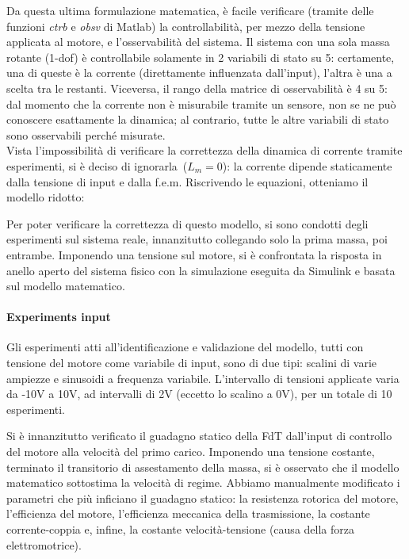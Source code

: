 Da questa ultima formulazione matematica, è facile verificare (tramite delle funzioni \textit{ctrb} e \textit{obsv} di Matlab) la controllabilità, per mezzo della tensione applicata al motore, e l'osservabilità del sistema.
Il sistema con una sola massa rotante (1-dof) è controllabile solamente in 2 variabili di stato su 5: certamente, una di queste è la corrente (direttamente influenzata dall'input), l'altra è una a scelta tra le restanti. Viceversa, il rango della matrice di osservabilità è 4 su 5: dal momento che la corrente non è misurabile tramite un sensore, non se ne può conoscere esattamente la dinamica; al contrario, tutte le altre variabili di stato sono osservabili perché misurate. \\

Vista l'impossibilità di verificare la correttezza della dinamica di corrente tramite esperimenti, si è deciso di ignorarla~($L_m = 0$): la corrente dipende staticamente dalla tensione di input e dalla f.e.m. Riscrivendo le equazioni, otteniamo il modello ridotto:


Per poter verificare la correttezza di questo modello, si sono condotti degli esperimenti sul sistema reale, innanzitutto collegando solo la prima massa, poi entrambe.
Imponendo una tensione sul motore, si è confrontata la risposta in anello aperto del sistema fisico con la simulazione eseguita da Simulink e basata sul modello matematico.
\paragraph{Experiments input}
Gli esperimenti atti all'identificazione e validazione del modello, tutti con tensione del motore come variabile di input, sono di due tipi: scalini di varie ampiezze e sinusoidi a frequenza variabile. 
L'intervallo di tensioni applicate varia da -10V a 10V, ad intervalli di 2V (eccetto lo scalino a 0V), per un totale di 10 esperimenti.

Si è innanzitutto verificato il guadagno statico della FdT dall'input di controllo del motore alla velocità del primo carico. Imponendo una tensione costante, terminato il transitorio di assestamento della massa, si è osservato che il modello matematico sottostima la velocità di regime.
Abbiamo manualmente modificato i parametri che più inficiano il guadagno statico: la resistenza rotorica del motore, l'efficienza del motore, l'efficienza meccanica della trasmissione, la costante corrente-coppia e, infine, la costante velocità-tensione (causa della forza elettromotrice).

